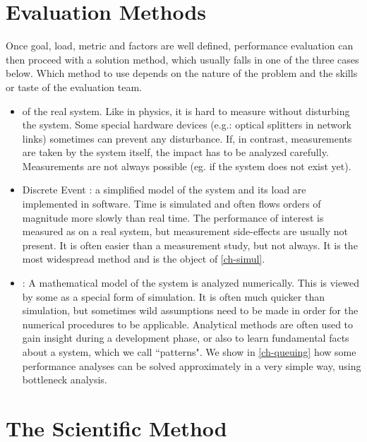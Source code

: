 \section{Evaluation Methods} Once goal, load, metric and factors
are well defined, performance evaluation can then
proceed with a solution method, which usually
falls in one of the three cases below. Which
method to use depends on the nature of the
problem and the skills or taste of the evaluation
team.\doitemsep
\begin{itemize}
  \item {} of the real system. Like in physics, it is hard to
measure
  without disturbing the system. Some special hardware devices (e.g.: optical splitters in network links)
  sometimes can prevent any disturbance. If, in contrast, measurements are taken by the system
  itself, the impact has to be analyzed carefully.
  Measurements are not always possible (eg. if the
 system does not exist yet).
  \item Discrete Event : a simplified model of the system and its load are implemented in
  software. Time is simulated and often flows orders of magnitude more slowly than real
  time. The performance of interest is measured as on a real system, but measurement
  side-effects are usually not present. It is often easier than a measurement study, but not
  always. It is the most widespread method and is the object of
  \cref{ch-simul}.
  \item {}: A mathematical model of the system is analyzed numerically. This is viewed
  by some as a special form of simulation. It is often much quicker than simulation,
  but sometimes wild assumptions need to be made in order for the numerical procedures to be
  applicable. Analytical methods are often used to gain insight
  during a development phase, or also to learn fundamental facts
  about a system, which we call ``patterns". We show in \cref{ch-queuing} how some performance analyses can
  be solved approximately in a very simple way, using bottleneck
  analysis. %
\end{itemize}

\section{The Scientific Method} 


